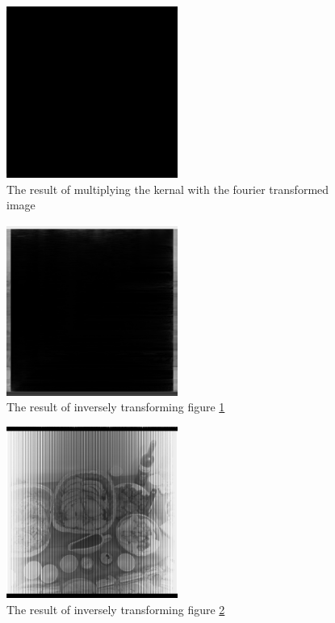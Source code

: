 \documentclass{article}
\begin{document}
\begin{figure}[H]
    \centering
    \caption{The result of multiplying the kernal with the fourier transformed image}
    \label{fig:boxMultiply2}
    \includegraphics[width=0.5\textwidth]{convolution_image2.png}
\end{figure}

\begin{figure}[H]
    \centering
    \caption{The result of inversely transforming figure \ref{fig:boxMultiply2}}
    \label{fig:fourierMultiply2}
    \includegraphics[width=0.5\textwidth]{inverse_fourier_image2.png}
\end{figure}

\begin{figure}[H]
    \centering
    \caption{The result of inversely transforming figure \ref{fig:fourierMultiply2}}
    \label{fig:fourierTransformFinal}
    \includegraphics[width=0.5\textwidth]{double_inverse_fourier_image2.png}
\end{figure}
\end{document}

